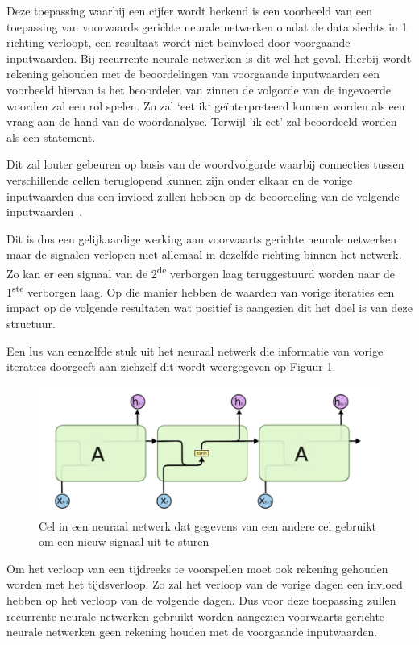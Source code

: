 Deze toepassing waarbij een cijfer wordt herkend is een voorbeeld van een toepassing van voorwaards gerichte neurale netwerken omdat de data slechts in 1 richting verloopt, een resultaat wordt niet be\"{i}nvloed door voorgaande inputwaarden. Bij recurrente neurale netwerken is dit wel het geval. Hierbij wordt rekening gehouden met de beoordelingen van voorgaande inputwaarden een voorbeeld hiervan is het beoordelen van zinnen de volgorde van de ingevoerde woorden zal een rol spelen. Zo zal `eet ik` ge\"{i}nterpreteerd kunnen worden als een vraag aan de hand van de woordanalyse. Terwijl 'ik eet' zal beoordeeld worden als een statement. 

Dit zal louter gebeuren op basis van de woordvolgorde waarbij connecties tussen verschillende cellen teruglopend kunnen zijn onder elkaar en de vorige inputwaarden dus een invloed zullen hebben op de beoordeling van de volgende inputwaarden~\autocite{Lievens2018a}.

Dit is dus een gelijkaardige werking aan voorwaarts gerichte neurale netwerken maar de signalen verlopen niet allemaal in dezelfde richting binnen het netwerk. Zo kan er een signaal van de 2\textsuperscript{de} verborgen laag teruggestuurd worden naar de 1\textsuperscript{ste} verborgen laag. Op die manier hebben de waarden van vorige iteraties een impact op de volgende resultaten wat positief is aangezien dit het doel is van deze structuur. 

Een lus van eenzelfde stuk uit het neuraal netwerk die informatie van vorige iteraties doorgeeft aan zichzelf dit wordt weergegeven op Figuur \ref{fig:lstmfig1}.

\begin{figure}[!h]
    \centering
    \caption{Cel in een neuraal netwerk dat gegevens van een andere cel gebruikt om een nieuw signaal uit te sturen~\autocite{Olah2015}}
    \label{fig:lstmfig1}
    \includegraphics[width=0.7\linewidth]{lstmFig1}
\end{figure}

Om het verloop van een tijdreeks te voorspellen moet ook rekening gehouden worden met het tijdsverloop. Zo zal het verloop van de vorige dagen een invloed hebben op het verloop van de volgende dagen. Dus voor deze toepassing zullen recurrente neurale netwerken gebruikt worden aangezien voorwaarts gerichte neurale netwerken geen rekening houden met de voorgaande inputwaarden. 

